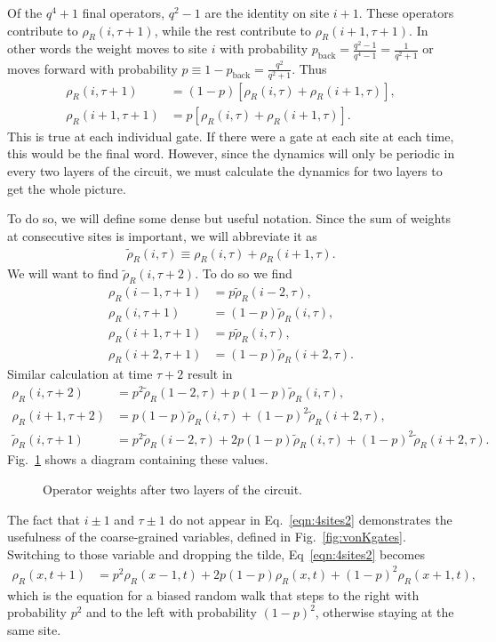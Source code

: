\documentclass[a4paper,11pt]{article}
\renewcommand{\th}[1]{\frac{1}{#1}}
\renewcommand{\t}{\tau}
\newcommand{\nn}{\nonumber\\}
\begin{document}
Of the $q^4+1$ final operators, $q^2-1$ are the identity on site $i+1$. These operators contribute to $\rho_R(i,\tau+1)$, while the rest contribute to $\rho_R(i+1, \tau+1)$. In other words the weight moves to site $i$ with probability $p_\text{back} = \frac{q^2-1}{q^4-1} = \th{q^2+1}$ or moves forward with probability $p\equiv 1- p_\text{back} = \frac{q^2}{q^2+1}$. Thus
\begin{align}
\rho_R(i,  \t+1) &= (1-p)\left[\rho_R(i,\t)+\rho_R(i+1,\t)\right],\nn
\rho_R(i+1,\t+1) &=    p \left[\rho_R(i,\t)+\rho_R(i+1,\t)\right].
\end{align}
This is true at each individual gate. If there were a gate at each site at each time, this would be the final word. However, since the dynamics will only be periodic in every two layers of the circuit, we must calculate the dynamics for two layers to get the whole picture.

To do so, we will define some dense but useful notation. Since the sum of weights at consecutive sites is important, we will abbreviate it as
\begin{align}
\tilde{\rho}_R(i,\t) \equiv \rho_R(i,\tau) + \rho_R(i+1, \tau). \label{eqn:rhotil}
\end{align}
We will want to find $\tilde{\rho}_R(i,\t+2)$. To do so we find
\begin{align}
\rho_R(i-1, \t+1) &=    p  \tilde{\rho}_R(i-2, \t),\nn
\rho_R(i  , \t+1) &= (1-p) \tilde{\rho}_R(i  , \t),\nn
\rho_R(i+1, \t+1) &=    p  \tilde{\rho}_R(i  , \t),\nn
\rho_R(i+2, \t+1) &= (1-p) \tilde{\rho}_R(i+2, \t).\label{eqn:4sites1}
\end{align}
Similar calculation at time $\t+2$ result in
\begin{align}
\rho_R(i  , \t+2) &= p^2\tilde{\rho}_R(1-2,\t) + p(1-p)\tilde{\rho}_R(i,\t),\nn
\rho_R(i+1, \t+2) &= p(1-p)\tilde{\rho}_R(i,\t) + (1-p)^2\tilde{\rho}_R(i+2,
	\t), \nn
\tilde{\rho}_R(i,\t+1)&=p^2\tilde{\rho}_R(i-2,\t)+2p(1-p)\tilde{\rho}_R(i,\t)+
	(1-p)^2\tilde{\rho}_R(i+2,\t). \label{eqn:4sites2}
\end{align}
Fig.~\ref{fig:4sites} shows a diagram containing these values.
\begin{figure}
	\centering
	
	\caption{Operator weights after two layers of the circuit.}
	\label{fig:4sites}
\end{figure}

The fact that $i\pm1$ and $\t\pm1$ do not appear in Eq.~\ref{eqn:4sites2} demonstrates the usefulness of the coarse-grained variables, defined in Fig.~\ref{fig:vonKgates}. Switching to those variable and dropping the tilde, Eq~\ref{eqn:4sites2} becomes
\begin{align}
\rho_R(x,t+1)&=p^2\rho_R(x-1,t)+2p(1-p)\rho_R(x,t)+(1-p)^2\rho_R(x+1,t), 
	\label{eqn:4sites3}
\end{align}
which is the equation for a biased random walk that steps to the right with probability $p^2$ and to the left with probability $(1-p)^2$, otherwise staying at the same site. 
\end{document}
